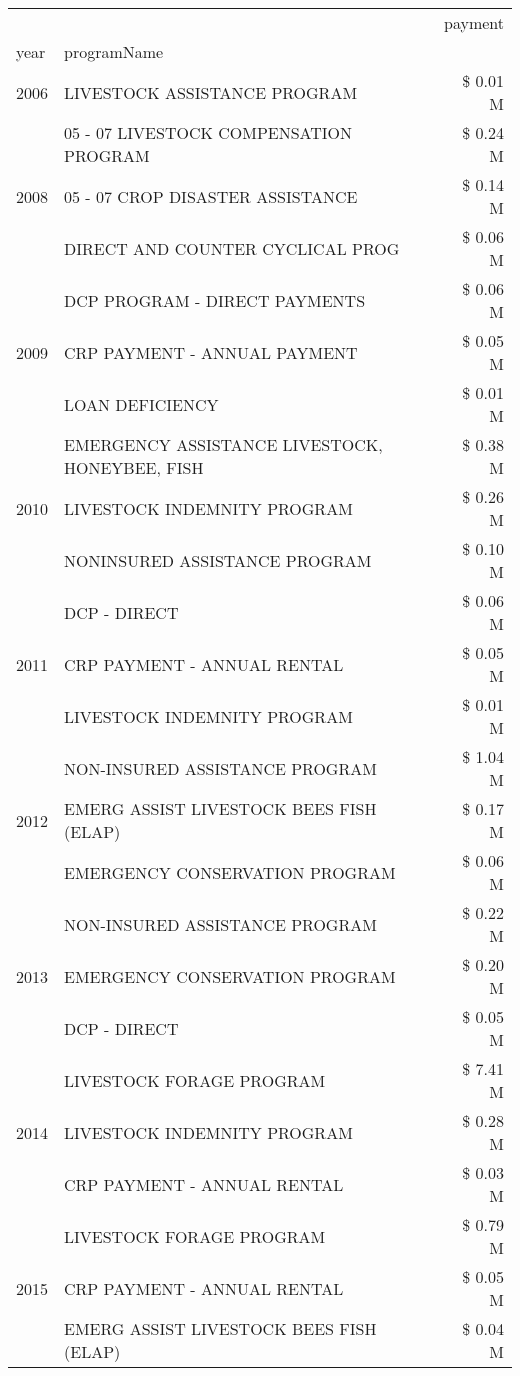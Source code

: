 \begin{tabular}{llr}
\toprule
 &  & payment \\
year & programName &  \\
\midrule
2006 & LIVESTOCK ASSISTANCE PROGRAM & \$ 0.01 M \\
\cline{1-3}
\multirow[t]{3}{*}{2008} & 05 - 07 LIVESTOCK COMPENSATION PROGRAM & \$ 0.24 M \\
 & 05 - 07 CROP DISASTER ASSISTANCE & \$ 0.14 M \\
 & DIRECT AND COUNTER CYCLICAL PROG & \$ 0.06 M \\
\cline{1-3}
\multirow[t]{3}{*}{2009} & DCP PROGRAM - DIRECT PAYMENTS & \$ 0.06 M \\
 & CRP PAYMENT - ANNUAL PAYMENT & \$ 0.05 M \\
 & LOAN DEFICIENCY & \$ 0.01 M \\
\cline{1-3}
\multirow[t]{3}{*}{2010} & EMERGENCY ASSISTANCE LIVESTOCK, HONEYBEE, FISH & \$ 0.38 M \\
 & LIVESTOCK INDEMNITY PROGRAM & \$ 0.26 M \\
 & NONINSURED ASSISTANCE PROGRAM & \$ 0.10 M \\
\cline{1-3}
\multirow[t]{3}{*}{2011} & DCP - DIRECT & \$ 0.06 M \\
 & CRP PAYMENT - ANNUAL RENTAL & \$ 0.05 M \\
 & LIVESTOCK INDEMNITY PROGRAM & \$ 0.01 M \\
\cline{1-3}
\multirow[t]{3}{*}{2012} & NON-INSURED ASSISTANCE PROGRAM & \$ 1.04 M \\
 & EMERG ASSIST LIVESTOCK BEES FISH (ELAP) & \$ 0.17 M \\
 & EMERGENCY CONSERVATION PROGRAM & \$ 0.06 M \\
\cline{1-3}
\multirow[t]{3}{*}{2013} & NON-INSURED ASSISTANCE PROGRAM & \$ 0.22 M \\
 & EMERGENCY CONSERVATION PROGRAM & \$ 0.20 M \\
 & DCP - DIRECT & \$ 0.05 M \\
\cline{1-3}
\multirow[t]{3}{*}{2014} & LIVESTOCK FORAGE PROGRAM & \$ 7.41 M \\
 & LIVESTOCK INDEMNITY PROGRAM & \$ 0.28 M \\
 & CRP PAYMENT - ANNUAL RENTAL & \$ 0.03 M \\
\cline{1-3}
\multirow[t]{3}{*}{2015} & LIVESTOCK FORAGE PROGRAM & \$ 0.79 M \\
 & CRP PAYMENT - ANNUAL RENTAL & \$ 0.05 M \\
 & EMERG ASSIST LIVESTOCK BEES FISH (ELAP) & \$ 0.04 M \\

\end{tabular}
